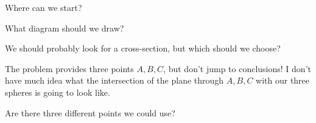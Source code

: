 Where can we start?











What diagram should we draw?







We should probably look for a cross-section, but which should we choose?

The problem provides three points $A,B,C$, but don't jump to conclusions! I don't have much idea what the intersection of the plane through $A,B,C$ with our three spheres is going to look like.

Are there three different points we could use?


